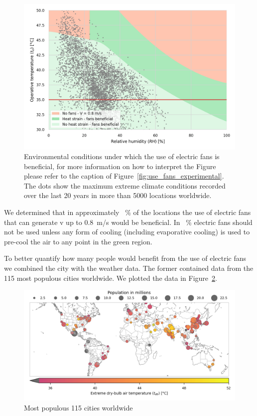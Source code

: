 \begin{figure}[hbt!]
    \centering
    \includegraphics[width=\textwidth]{figures/use_fans}
    \caption{Environmental conditions under which the use of electric fans is beneficial, for more information on how to interpret the Figure please refer to the caption of Figure~\ref{fig:use_fans_experimental}.
    The dots show the maximum extreme climate conditions recorded over the last 20 years in more than 5000 locations worldwide.}
    \label{fig:energy_storage_delta}
\end{figure}

We determined that in approximately ~\% of the locations the use of electric fans that can generate \ac{v} up to 0.8~m/s would be beneficial.
In ~\% electric fans should not be used unless any form of cooling (including evaporative cooling) is used to pre-cool the air to any point in the green region.

To better quantify how many people would benefit from the use of electric fans we combined the city with the weather data.
The former contained data from the 115 most populous cities worldwide.
We plotted the data in Figure~\ref{fig:map-population-temperature}.

\begin{figure}[hbt!]
    \centering
    \includegraphics[width=\textwidth]{figures/map-population-temperature}
    \caption{Most populous 115 cities worldwide}
    \label{fig:map-population-temperature}
\end{figure}

